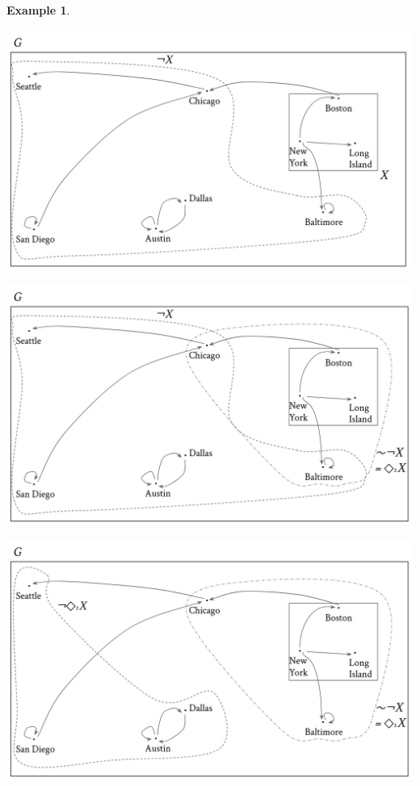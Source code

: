\documentclass[11pt]{book}
\theoremstyle{definition}
\newtheorem{example}{Example}[section]
\theoremstyle{definition}
\theoremstyle{definition}
\theoremstyle{theorem}
\theoremstyle{definition}
\begin{document}
\begin{example}
	\begin{center}
		\includegraphics*[scale=0.2]{RoutesGraph4.png}
	\end{center}
	\begin{center}
		\includegraphics*[scale=0.2]{RoutesGraph5.png}
	\end{center}
	\begin{center}
		\includegraphics*[scale=0.2]{RoutesGraph6.png}

\end{center}
\end{example}
\end{document}
